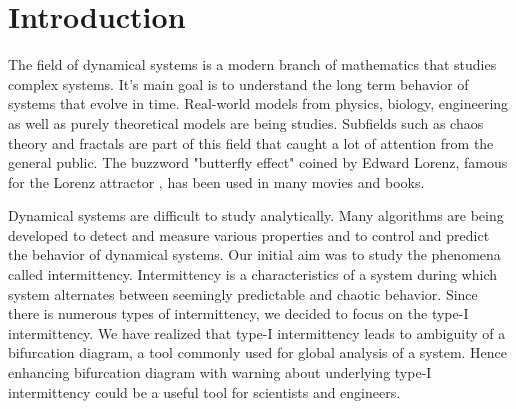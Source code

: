 \chapter{Introduction}
\label{sec:Introduction}

The field of dynamical systems is a modern branch of mathematics that studies complex systems.
It's main goal is to understand the long term behavior of systems that evolve in time.
Real-world models from physics, biology, engineering as well as purely theoretical models are being studies.
Subfields such as chaos theory and fractals are part of this field that caught a lot of attention from the general public.
The buzzword "butterfly effect" coined by Edward Lorenz, famous for the Lorenz attractor \cite{Lorenz2004}, has been used in many movies and books.
\par
Dynamical systems are difficult to study analytically.
Many algorithms are being developed to detect and measure various properties and to control and predict the behavior of dynamical systems.
Our initial aim was to study the phenomena called intermittency.
Intermittency is a characteristics of a system during which system alternates between seemingly predictable and chaotic behavior.
Since there is numerous types of intermittency, we decided to focus on the type-I intermittency.
We have realized that type-I intermittency leads to ambiguity of a bifurcation diagram, a tool commonly used for global analysis of a system.
Hence enhancing bifurcation diagram with warning about underlying type-I intermittency could be a useful tool for scientists and engineers.


\endinput